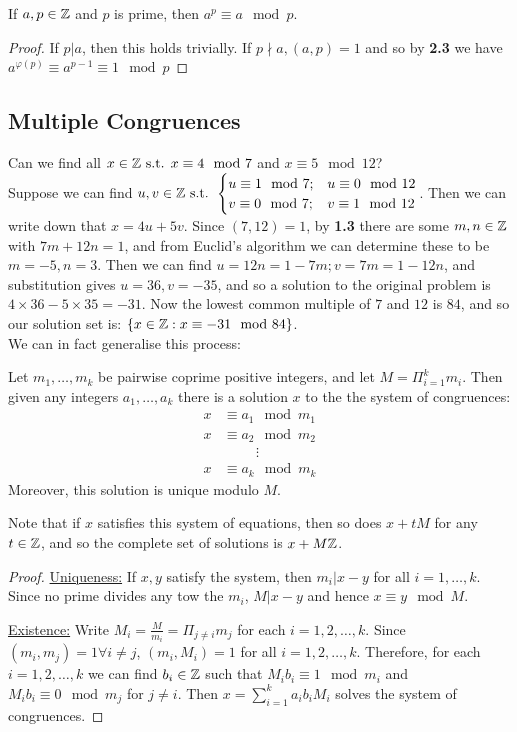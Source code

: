 \documentclass[10pt,a4paper]{article}
\begin{document}
\begin{theorem}
If $a, p \in \mathbb{Z}$ and $p$ is prime, then $a^p\equiv a \mod p$.
\end{theorem}
\begin{proof}
If $p|a$, then this holds trivially. If $p\nmid a, (a,p) =1$ and so by \textbf{2.3} we have $a^{\varphi(p)} \equiv a^{p-1} \equiv 1 \mod p$
\end{proof}

\subsection*{Multiple Congruences}
Can we find all $x\in \mathbb{Z} \text{ s.t. } x \equiv 4 \mod 7$ and $x \equiv 5 \mod 12$?\\
Suppose we can find $u,v\in\mathbb{Z} \text{ s.t. } \begin{cases}u\equiv 1 \mod 7; & u\equiv 0 \mod 12 \\ v \equiv 0 \mod 7; & v\equiv 1 \mod 12\end{cases}$. Then we can write down that $x = 4u+5v$. Since $(7,12)=1$, by \textbf{1.3} there are some $m,n\in\mathbb{Z}$ with $7m+12n=1$, and from Euclid's algorithm we can determine these to be $m=-5, n=3$. Then we can find $u=12n=1-7m; v=7m=1-12n$, and substitution gives $u=36, v=-35$, and so a solution to the original problem is $4\times 36-5\times 35 = -31$. Now the lowest common multiple of $7$ and $12$ is $84$, and so our solution set is: $\{x\in\mathbb{Z}: x\equiv -31 \mod 84\}$.\\
We can in fact generalise this process:
\begin{theorem}
Let $m_1,\ldots,m_k$ be pairwise coprime positive integers, and let $M = \Pi_{i=1}^k m_i$. Then given any integers $a_1,\ldots,a_k$ there is a solution $x$ to the the system of congruences:
\begin{align*}
x &\equiv a_1 \mod m_1\\
x &\equiv a_2 \mod m_2\\
&\hspace{1cm}\vdots\\
x &\equiv a_k \mod m_k
\end{align*}
Moreover, this solution is unique modulo $M$.
\end{theorem}
Note that if $x$ satisfies this system of equations, then so does $x+tM$ for any $t\in\mathbb{Z}$, and so the complete set of solutions is $x+M\mathbb{Z}$.

\begin{proof}\item
\underline{Uniqueness:} If $x,y$ satisfy the system, then $m_i | x-y$ for all $i=1,\ldots, k$. Since no prime divides any tow the $m_i$, $M|x-y$ and hence $x\equiv y\mod M$.

\underline{Existence:} Write $M_i = \frac{M}{m_i} = \Pi_{j\neq i} m_j$ for each $i=1,2,\ldots,k$. Since $(m_i,m_j)=1 \forall i\neq j$, $(m_i,M_i) = 1$ for all $i=1,2,\ldots, k$. Therefore, for each $i=1,2,\ldots,k$ we can find $b_i \in \mathbb{Z}$ such that $M_i b_i \equiv 1 \mod m_i$ and $M_i b_i \equiv 0 \mod m_j$ for $j\neq i$. Then $x=\sum_{i=1}^k a_ib_iM_i$ solves the system of congruences.
\end{proof}
\end{document}
